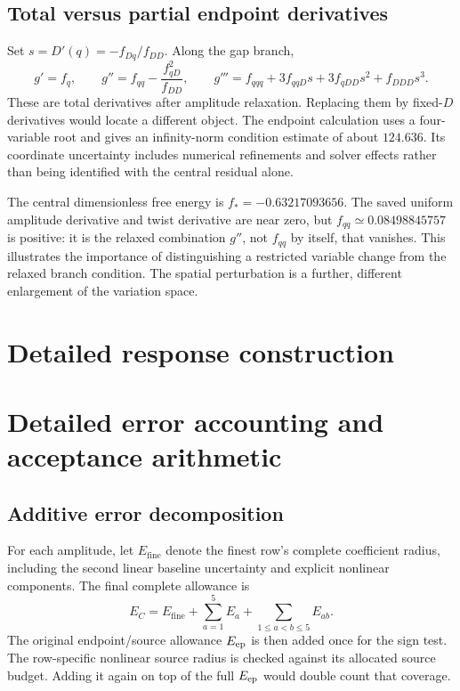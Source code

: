 \subsection{Total versus partial endpoint derivatives}
Set $s=D'(q)=-f_{Dq}/f_{DD}$. Along the gap branch,
\begin{equation}
 g'=f_q,\qquad
 g''=f_{qq}-\frac{f_{qD}^2}{f_{DD}},\qquad
 g'''=f_{qqq}+3f_{qqD}s+3f_{qDD}s^2+f_{DDD}s^3.
\end{equation}
These are total derivatives after amplitude relaxation. Replacing them by fixed-$D$ derivatives would locate a different object. The endpoint calculation uses a four-variable root and gives an infinity-norm condition estimate of about $124.636$. Its coordinate uncertainty includes numerical refinements and solver effects rather than being identified with the central residual alone.

The central dimensionless free energy is $f_*=-0.63217093656$. The saved uniform amplitude derivative and twist derivative are near zero, but $f_{qq}\simeq0.08498845757$ is positive: it is the relaxed combination $g''$, not $f_{qq}$ by itself, that vanishes. This illustrates the importance of distinguishing a restricted variable change from the relaxed branch condition. The spatial perturbation is a further, different enlargement of the variation space.

\section{Detailed response construction}\label{app:response}


\section{Detailed error accounting and acceptance arithmetic}\label{app:errors}
\subsection{Additive error decomposition}
For each amplitude, let $E_{\mathrm{fine}}$ denote the finest row's complete coefficient radius, including the second linear baseline uncertainty and explicit nonlinear components. The final complete allowance is
\begin{equation}\label{eq:EIassembled}
 E_C=E_{\mathrm{fine}}+\sum_{a=1}^5E_a
 +\sum_{1\le a<b\le5}E_{ab}.
\end{equation}
The original endpoint/source allowance $E_{\mathrm{ep}}$ is then added once for the sign test. The row-specific nonlinear source radius is checked against its allocated source budget. Adding it again on top of the full $E_{\mathrm{ep}}$ would double count that coverage.


